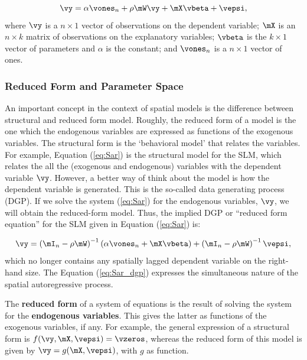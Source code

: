 \documentclass[english,12pt]{book}\usepackage[]{graphicx}\usepackage[]{xcolor}
\begin{document}
\begin{equation}\label{eq:Sar}
\vy  =  \alpha \vones_n+ \rho \mW\vy + \mX\vbeta + \vepsi,
\end{equation}
%
where $\vy$ is a $n\times 1$ vector of observations on the dependent variable; $\mX$ is an $n\times k$ matrix of observations on the explanatory variables; $\vbeta$ is the $k\times 1$ vector of parameters and $\alpha$ is the constant; and $\vones_n$ is a $n\times 1$ vector of ones.

\subsubsection{Reduced Form and Parameter Space}

An important concept in the context of spatial models is the difference between structural and reduced form model. Roughly, the reduced form of a model is the one which the endogenous variables are expressed as functions of the exogenous variables. The structural form is the `behavioral model' that relates the variables. For example, Equation (\ref{eq:Sar}) is the structural model for the SLM, which relates the all the (exogenous and endogenous) variables with the dependent variable $\vy$. However, a better way of think about the model is how the dependent variable is generated. This is the so-called data generating process (DGP). If we solve the system (\ref{eq:Sar}) for the endogenous variables, $\vy$, we will obtain the reduced-form model. Thus, the implied 
DGP or ``reduced form equation'' for the SLM given in Equation (\ref{eq:Sar}) is:

\begin{equation}\label{eq:Sar_dgp}
\vy  =  \left(\mI_n - \rho \mW\right)^{-1}\left(\alpha \vones_n + \mX\vbeta\right) + \left(\mI_n - \rho \mW\right)^{-1}\vepsi,
\end{equation}
%
which no longer contains any spatially lagged dependent variable on the right-hand size. The Equation (\ref{eq:Sar_dgp}) expresses the simultaneous nature of the spatial autoregressive process.

\begin{remark}
The \textbf{reduced form} of a system of equations is the result of solving the system for the \textbf{endogenous variables}. This gives the latter as functions of the exogenous variables, if any. For example, the general expression of a structural form is $f(\vy, \mX, \vepsi) = \vzeros$, whereas the reduced form of this model is given by $\vy = g(\mX, \vepsi)$, with $g$ as function. 
\end{remark}
\end{document}

